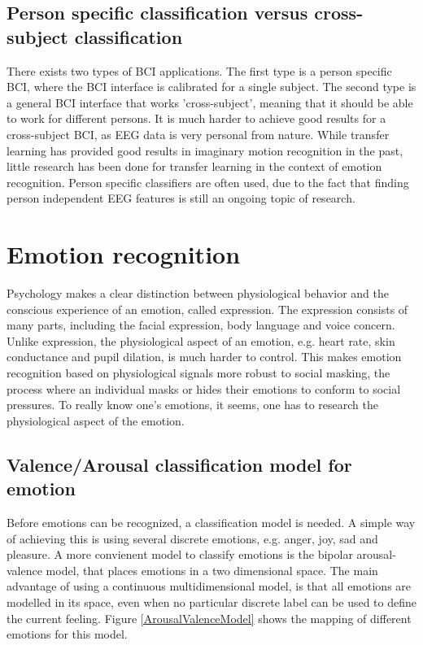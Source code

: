 \subsection{Person specific classification versus cross-subject classification}
There exists two types of BCI applications. The first type is a person specific BCI, where the BCI interface is calibrated for a single subject. The second type is a general BCI interface that works 'cross-subject', meaning that it should be able to work for different persons. It is much harder to achieve good results for a cross-subject BCI, as EEG data is very personal from nature\citep{DEAP}. While transfer learning has provided good results in imaginary motion recognition in the past, little research has been done for transfer learning in the context of emotion recognition. Person specific classifiers are often used, due to the fact that finding person independent EEG features is still an ongoing topic of research\citep{DEAP}.

\section{Emotion recognition}

Psychology makes a clear distinction between physiological behavior and the conscious experience of an emotion, called expression\cite{ExtendedPaper}. The expression consists of many parts, including the facial expression, body language and voice concern\citep{EMSpeech}. Unlike expression, the physiological aspect of an emotion, e.g. heart rate, skin conductance and pupil dilation, is much harder to control. This makes emotion recognition based on physiological signals more robust to social masking\citep{PhytoEm}, the process where an individual masks or hides their emotions to conform to social pressures. To really know one's emotions, it seems, one has to research the physiological aspect of the emotion.

\subsection{Valence/Arousal classification model for emotion}
\label{valarrdomspace}

Before emotions can be recognized, a classification model is needed. A simple way of achieving this is using several discrete emotions, e.g. anger, joy, sad and pleasure. A more convienent model to classify emotions is the bipolar arousal-valence model\cite{ExtendedPaper,RealTimeEEGEmotion}, that places emotions in a two dimensional space. The main advantage of using a continuous multidimensional model, is that all emotions are modelled in its space, even when no particular discrete label can be used to define the current feeling. Figure \ref{ArousalValenceModel} shows the mapping of different emotions for this model. 

